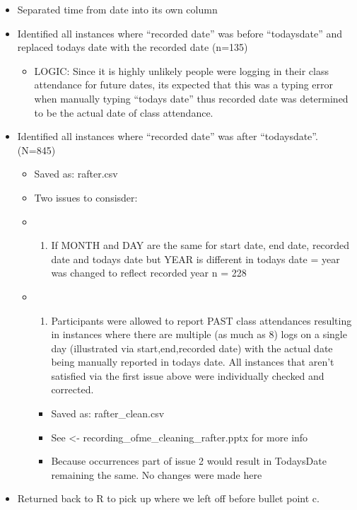 \documentclass[
]{book}
\providecommand{\tightlist}{%
  \setlength{\itemsep}{0pt}\setlength{\parskip}{0pt}}
\begin{document}
\begin{itemize}
\tightlist
\item
  Separated time from date into its own column
\item
  Identified all instances where ``recorded date'' was before ``todaysdate'' and replaced todays date with the recorded date (n=135)

  \begin{itemize}
  \tightlist
  \item
    LOGIC: Since it is highly unlikely people were logging in their class attendance for future dates, its expected that this was a typing error when manually typing ``todays date'' thus recorded date was determined to be the actual date of class attendance.
  \end{itemize}
\item
  Identified all instances where ``recorded date'' was after ``todaysdate''. (N=845)

  \begin{itemize}
  \item
    Saved as: rafter.csv
  \item
    Two issues to consisder:
  \item
    \begin{enumerate}
    \def\labelenumi{\arabic{enumi})}
    \tightlist
    \item
      If MONTH and DAY are the same for start date, end date, recorded date and todays date but YEAR is different in todays date = year was changed to reflect recorded year n = 228
    \end{enumerate}
  \item
    \begin{enumerate}
    \def\labelenumi{\arabic{enumi})}
    \setcounter{enumi}{1}
    \tightlist
    \item
      Participants were allowed to report PAST class attendances resulting in instances where there are multiple (as much as 8) logs on a single day (illustrated via start,end,recorded date) with the actual date being manually reported in todays date. All instances that aren't satisfied via the first issue above were individually checked and corrected.
    \end{enumerate}

    \begin{itemize}
    \tightlist
    \item
      Saved as: rafter\_clean.csv
    \item
      See \textless- recording\_ofme\_cleaning\_rafter.pptx for more info
    \item
      Because occurrences part of issue 2 would result in TodaysDate remaining the same. No changes were made here
    \end{itemize}
  \end{itemize}
\item
  Returned back to R to pick up where we left off before bullet point c.


\end{itemize}
\end{document}

